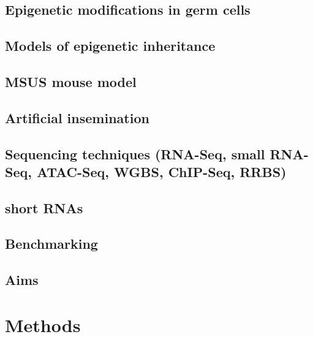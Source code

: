 \documentclass[12pt,twoside]{reedthesis}
\begin{document}
\hypertarget{epigenetic-modifications-in-germ-cells}{%
\section{Epigenetic modifications in germ cells}\label{epigenetic-modifications-in-germ-cells}}

\hypertarget{models-of-epigenetic-inheritance}{%
\section{Models of epigenetic inheritance}\label{models-of-epigenetic-inheritance}}

\hypertarget{msus-mouse-model}{%
\section{MSUS mouse model}\label{msus-mouse-model}}

\hypertarget{artificial-insemination}{%
\section{Artificial insemination}\label{artificial-insemination}}

\hypertarget{sequencing-techniques-rna-seq-small-rna-seq-atac-seq-wgbs-chip-seq-rrbs}{%
\section{Sequencing techniques (RNA-Seq, small RNA-Seq, ATAC-Seq, WGBS, ChIP-Seq, RRBS)}\label{sequencing-techniques-rna-seq-small-rna-seq-atac-seq-wgbs-chip-seq-rrbs}}

\hypertarget{short-rnas}{%
\section{short RNAs}\label{short-rnas}}

\hypertarget{benchmarking}{%
\section{Benchmarking}\label{benchmarking}}

\hypertarget{aims}{%
\section{Aims}\label{aims}}

\hypertarget{methods}{%
\chapter{Methods}\label{methods}}
\end{document}

